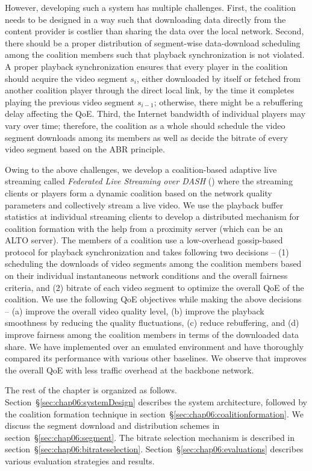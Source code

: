 However, developing such a system has multiple challenges. First, the coalition needs to be designed in a way such that downloading data directly from the content provider is costlier than sharing the data over the local network. Second, there should be a proper distribution of segment-wise data-download scheduling among the coalition members such that playback synchronization is not violated. A proper playback synchronization ensures that every player in the coalition should acquire the video segment $s_{i}$, either downloaded by itself or fetched from another coalition player through the direct local link, by the time it completes playing the previous video segment $s_{i-1}$; otherwise, there might be a rebuffering delay affecting the \ac{QoE}. Third, the Internet bandwidth of individual players may vary over time; therefore, the coalition as a whole should schedule the video segment downloads among its members as well as decide the bitrate of every video segment based on the \ac{ABR} principle.

Owing to the above challenges, we develop a coalition-based adaptive live streaming  called \textit{Federated Live Streaming over \ac{DASH}} (\our) where the streaming clients or players form a dynamic coalition based on the network quality parameters and collectively stream a live video. We use the playback buffer statistics at individual streaming clients to develop a distributed mechanism for coalition formation with the help from a proximity server (which can be an \ac{ALTO} server). The members of a coalition use a low-overhead gossip-based protocol for playback synchronization and takes following two decisions -- (1) scheduling the downloads of video segments among the coalition members based on their individual instantaneous network conditions and the overall fairness criteria, and (2) bitrate of each video segment to optimize the overall \ac{QoE} of the coalition. We use the following \ac{QoE} objectives while making the above decisions -- (a) improve the overall video quality level, (b) improve the playback smoothness by reducing the quality fluctuations, (c) reduce rebuffering, and (d) improve fairness  among the coalition members in terms of the downloaded data share. We have implemented {\our} over an emulated environment and have thoroughly compared its performance with various other baselines. We observe that {\our} improves the overall \ac{QoE} with less traffic overhead at the backbone network.

The rest of the chapter is organized as follows. Section~\S\ref{sec:chap06:systemDesign} describes the system architecture, followed by the coalition formation technique in section~\S\ref{sec:chap06:coalitionformation}. We discuss the segment download and distribution schemes in section~\S\ref{sec:chap06:segment}. The bitrate selection mechanism is described in section~\S\ref{sec:chap06:bitrateselection}. Section~\S\ref{sec:chap06:evaluations} describes various evaluation strategies and results.
